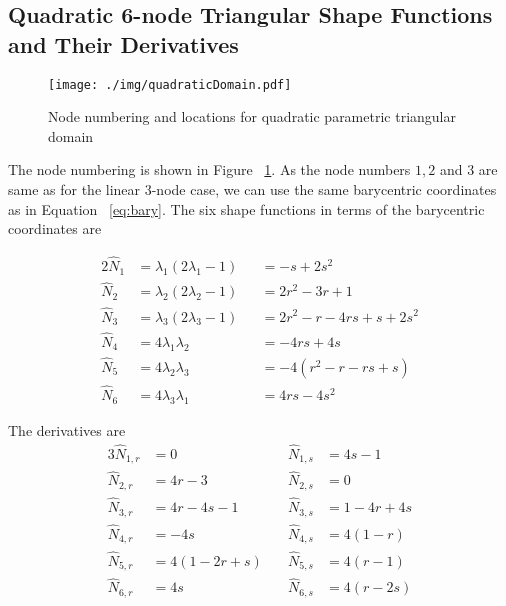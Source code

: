 \documentclass[../main.tex]{subfiles}
\begin{document}
\subsection*{Quadratic 6-node Triangular Shape Functions and Their
  Derivatives}
\begin{figure}[h]
  \centering
  \texttt{[image: ./img/quadraticDomain.pdf]}
  \caption{Node numbering and locations for quadratic parametric
    triangular domain}
  \label{fig:quadDom}
\end{figure}
The node numbering is shown in Figure ~\ref{fig:quadDom}. As the node
numbers $1,2$ and $3$ are same as for the linear 3-node case, we can
use the same barycentric coordinates as in Equation
~\ref{eq:bary}. The six shape functions in terms of the barycentric
coordinates are
\begin{center}
  \begin{alignat*}{2}
    \hat{N}_1 &= \lambda_1(2\lambda_1-1) &&= -s+2s^2 \\
    \hat{N}_2 &= \lambda_2(2\lambda_2-1) &&= 2r^2-3r+1\\
    \hat{N}_3 &= \lambda_3(2\lambda_3-1) &&= 2r^2-r-4rs+s+2s^2\\
    \hat{N}_4 &= 4\lambda_1\lambda_2 &&= -4rs +4s \\
    \hat{N}_5 &= 4\lambda_2\lambda_3 &&=  -4(r^2-r-rs+s)\\
    \hat{N}_6 &= 4\lambda_3\lambda_1 &&= 4rs-4s^2
  \end{alignat*}
\end{center}
The derivatives are
\begin{alignat*}{3}
  \hat{N}_{1,r} &= 0 &\quad\hat{N}_{1,s} &= 4s-1 \\
  \hat{N}_{2,r} &= 4r-3 &\quad\hat{N}_{2,s}&= 0 \\
  \hat{N}_{3,r} &= 4r-4s-1&\quad\hat{N}_{3,s} &= 1-4r+4s \\
  \hat{N}_{4,r} &= -4s &\quad\hat{N}_{4,s} &= 4(1-r) \\
  \hat{N}_{5,r} &= 4(1-2r+s)&\quad\hat{N}_{5,s} &= 4(r-1) \\
  \hat{N}_{6,r} &= 4s&\quad\hat{N}_{6,s} &= 4(r-2s)
\end{alignat*}
\end{document}
